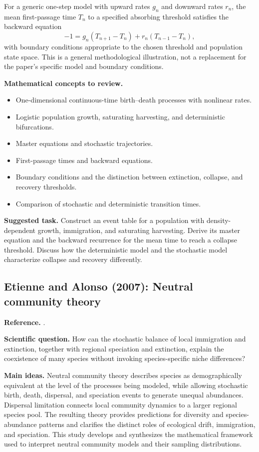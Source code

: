 For a generic one-step model with upward rates $g_n$ and downward rates
$r_n$, the mean first-passage time $T_n$ to a specified absorbing threshold
satisfies the backward equation
\begin{equation}
  -1=g_n(T_{n+1}-T_n)+r_n(T_{n-1}-T_n),
\end{equation}
with boundary conditions appropriate to the chosen threshold and population
state space. This is a general methodological illustration, not a
replacement for the paper's specific model and boundary conditions.

\medskip\noindent\textbf{Mathematical concepts to review.}
\begin{itemize}
  \item One-dimensional continuous-time birth--death processes with nonlinear rates.
  \item Logistic population growth, saturating harvesting, and deterministic bifurcations.
  \item Master equations and stochastic trajectories.
  \item First-passage times and backward equations.
  \item Boundary conditions and the distinction between extinction, collapse,
        and recovery thresholds.
  \item Comparison of stochastic and deterministic transition times.
\end{itemize}

\noindent\textbf{Suggested task.} Construct an event table for a population
with density-dependent growth, immigration, and saturating harvesting.
Derive its master equation and the backward recurrence for the mean time to
reach a collapse threshold. Discuss how the deterministic model and the
stochastic model characterize collapse and recovery differently.

\subsection{Etienne and Alonso (2007): Neutral community theory}
\label{subsec:etienne-alonso}
\noindent\textbf{Reference.} \citet{EtienneAlonso2007Neutral}.

\medskip\noindent\textbf{Scientific question.}
How can the stochastic balance of local immigration and extinction, together
with regional speciation and extinction, explain the coexistence of many
species without invoking species-specific niche differences?

\medskip\noindent\textbf{Main ideas.}
Neutral community theory describes species as demographically equivalent at
the level of the processes being modeled, while allowing stochastic birth,
death, dispersal, and speciation events to generate unequal abundances.
Dispersal limitation connects local community dynamics to a larger regional
species pool. The resulting theory provides predictions for diversity and
species-abundance patterns and clarifies the distinct roles of ecological
drift, immigration, and speciation. This study develops and synthesizes the
mathematical framework used to interpret neutral community models and their
sampling distributions.

